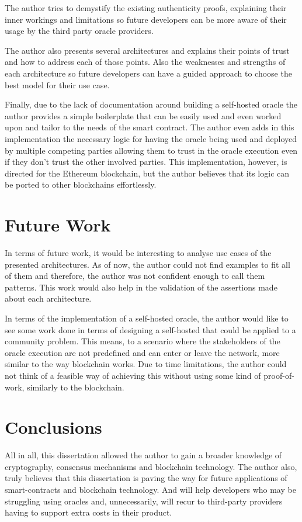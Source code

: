 The author tries to demystify the existing authenticity proofs, explaining their inner workings and limitations so future developers can be more aware of their usage by the third party oracle providers.

The author also presents several architectures and explains their points of trust and how to address each of those points. Also the weaknesses and strengths of each architecture so future developers can have a guided approach to choose the best model for their use case.

Finally, due to the lack of documentation around building a self-hosted oracle the author provides a simple boilerplate that can be easily used and even worked upon and tailor to the needs of the smart contract. The author even adds in this implementation the necessary logic for having the oracle being used and deployed by multiple competing parties allowing them to trust in the oracle execution even if they don't trust the other involved parties. This implementation, however, is directed for the Ethereum blockchain, but the author believes that its logic can be ported to other blockchains effortlessly.

\section{Future Work}

In terms of future work, it would be interesting to analyse use cases of the presented architectures. As of now, the author could not find examples to fit all of them and therefore, the author was not confident enough to call them patterns. This work would also help in the validation of the assertions made about each architecture.

In terms of the implementation of a self-hosted oracle, the author would like to see some work done in terms of designing a self-hosted that could be applied to a community problem. This means, to a scenario where the stakeholders of the oracle execution are not predefined and can enter or leave the network, more similar to the way blockchain works. Due to time limitations, the author could not think of a feasible way of achieving this without using some kind of proof-of-work, similarly to the blockchain.


\section{Conclusions}

All in all, this dissertation allowed the author to gain a broader knowledge of cryptography, consensus mechanisms and blockchain technology. The author also, truly believes that this dissertation is paving the way for future applications of smart-contracts and blockchain technology. And will help developers who may be struggling using oracles and, unnecessarily, will recur to third-party providers having to support extra costs in their product.